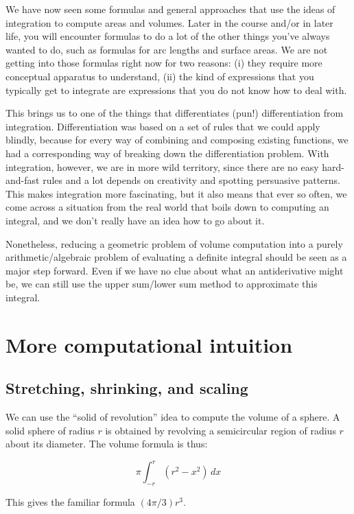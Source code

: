 \documentclass[10pt]{amsart}
\begin{document}
We have now seen some formulas and general approaches that use the
ideas of integration to compute areas and volumes. Later in the course
and/or in later life, you will encounter formulas to do a lot of the
other things you've always wanted to do, such as formulas for arc
lengths and surface areas. We are not getting into those formulas
right now for two reasons: (i) they require more conceptual apparatus
to understand, (ii) the kind of expressions that you typically get to
integrate are expressions that you do not know how to deal with.

This brings us to one of the things that differentiates (pun!)
differentiation from integration. Differentiation was based on a set
of rules that we could apply blindly, because for every way of
combining and composing existing functions, we had a corresponding way
of breaking down the differentiation problem. With integration,
however, we are in more wild territory, since there are no easy
hard-and-fast rules and a lot depends on creativity and spotting
persuasive patterns. This makes integration more fascinating, but it
also means that ever so often, we come across a situation from the
real world that boils down to computing an integral, and we don't
really have an idea how to go about it.

Nonetheless, reducing a geometric problem of volume computation into a
purely arithmetic/algebraic problem of evaluating a definite integral
should be seen as a major step forward. Even if we have no clue about
what an antiderivative might be, we can still use the upper sum/lower
sum method to approximate this integral.

\section{More computational intuition}

\subsection{Stretching, shrinking, and scaling}

We can use the ``solid of revolution'' idea to compute the volume of a
sphere. A solid sphere of radius $r$ is obtained by revolving a
semicircular region of radius $r$ about its diameter. The volume
formula is thus:

$$\pi \int_{-r}^r (r^2 - x^2) \, dx$$

This gives the familiar formula $(4\pi/3)r^3$.
\end{document}

